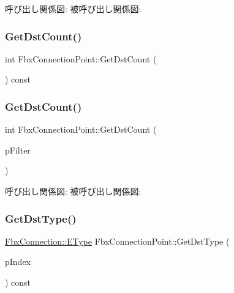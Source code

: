 呼び出し関係図\+:
被呼び出し関係図\+:
\mbox{\label{class_fbx_connection_point_a79f98c92a9b781bf056865632c2b4db7}} 
\subsubsection{\texorpdfstring{Get\+Dst\+Count()}{GetDstCount()}\hspace{0.1cm}{\footnotesize\ttfamily [1/2]}}
{\footnotesize\ttfamily int Fbx\+Connection\+Point\+::\+Get\+Dst\+Count (\begin{DoxyParamCaption}{ }\end{DoxyParamCaption}) const}

\mbox{\label{class_fbx_connection_point_ae2dca593c5c5a527e10a98f25795ecc8}} 
\subsubsection{\texorpdfstring{Get\+Dst\+Count()}{GetDstCount()}\hspace{0.1cm}{\footnotesize\ttfamily [2/2]}}
{\footnotesize\ttfamily int Fbx\+Connection\+Point\+::\+Get\+Dst\+Count (\begin{DoxyParamCaption}\item[{\hyperlink{class_fbx_connection_point_filter}{Fbx\+Connection\+Point\+Filter} $\ast$}]{p\+Filter }\end{DoxyParamCaption})}

呼び出し関係図\+:
被呼び出し関係図\+:
\mbox{\label{class_fbx_connection_point_af328bd58235b6255226320b9d69a606f}} 
\subsubsection{\texorpdfstring{Get\+Dst\+Type()}{GetDstType()}\hspace{0.1cm}{\footnotesize\ttfamily [1/2]}}
{\footnotesize\ttfamily \hyperlink{class_fbx_connection_a3df448a5db356652ab99fd2be2553749}{Fbx\+Connection\+::\+E\+Type} Fbx\+Connection\+Point\+::\+Get\+Dst\+Type (\begin{DoxyParamCaption}\item[{int}]{p\+Index }\end{DoxyParamCaption}) const}

